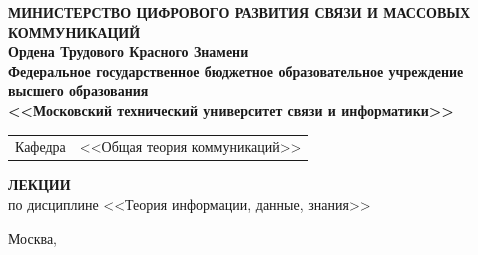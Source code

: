 \thispagestyle{empty}

\begin{center}
	\textbf{МИНИСТЕРСТВО ЦИФРОВОГО РАЗВИТИЯ СВЯЗИ И МАССОВЫХ КОММУНИКАЦИЙ} \\
	\textbf{Ордена Трудового Красного Знамени \\
	Федеральное государственное бюджетное образовательное учреждение высшего образования \\
	<<Московский технический университет связи и информатики>>}
\end{center}

\vspace{0.3em}

\begin{center}
	\begin{tabularx}{0.5\textwidth}{p{1.2cm}X}
		Кафедра & \quad <<Общая теория коммуникаций>> \\%
	\end{tabularx}
\end{center}

\vspace{12em}

\begin{center}
	\Large
	\textbf{ЛЕКЦИИ} \\
	\large
	по дисциплине <<Теория информации, данные, знания>> \\
\end{center}


\vspace{3em}


\vspace{8em}

\begin{center}
	Москва,~\the\year
\end{center}
\clearpage

